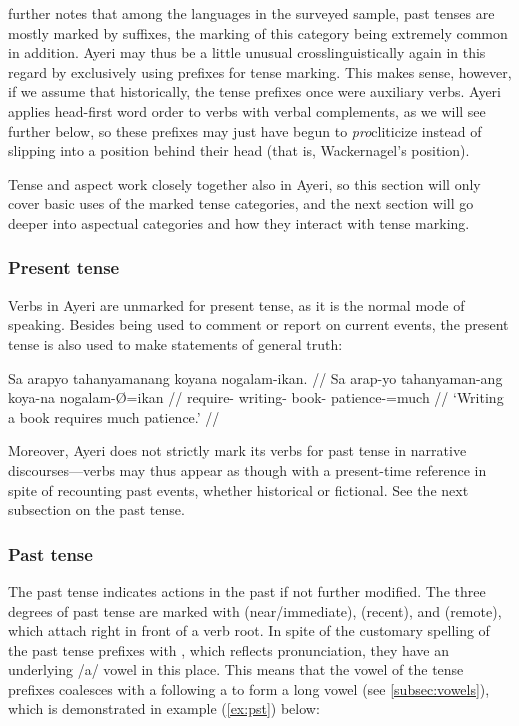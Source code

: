 \citet[117]{dahl1985} further notes that among the languages in the surveyed 
sample, past tenses are mostly marked by suffixes, the marking of this 
category being extremely common in addition. Ayeri may thus be a little unusual 
crosslinguistically again in this regard by exclusively using prefixes for 
tense marking. This makes sense, however, if we assume that historically, the 
tense prefixes once were auxiliary verbs. Ayeri applies head-first word 
order to verbs with verbal complements, as we will see further below, so these 
prefixes may just have begun to \emph{pro}cliticize instead of slipping 
into a position behind their head (that is, Wackernagel's position).

Tense and aspect work closely together also in Ayeri, so this section will only 
cover basic uses of the marked tense categories, and the next section will go 
deeper into aspectual categories and how they interact with tense marking.

\subsubsection{Present tense}
Verbs in Ayeri are unmarked for present tense, as it is the normal mode of 
speaking. Besides being used to comment or report on current events, the 
present tense is also used to make statements of general truth:

\ex\begingl
	\gla Sa arapyo tahanyamanang koyana nogalam-ikan. //
	\glb Sa arap-yo tahanyaman-ang koya-na nogalam-Ø=ikan //
	\glc \PatT{} require-\TsgN{} writing-\Aarg{} book-\Gen{} 
		patience-\Top{}=much //
	\glft `Writing a book requires much patience.' //
\endgl\xe

Moreover, Ayeri does not strictly mark its verbs for past tense in narrative 
discourses---verbs may thus appear as though with a present-time reference in 
spite of recounting past events, whether historical or fictional. See the next 
subsection on the past tense.


\subsubsection{Past tense}
The past tense indicates actions in the past if not further modified. 
The three degrees of past tense are marked with  
(near/immediate),  (recent), and  (remote), which 
attach right in front of a verb root. In spite of the customary spelling of the 
past tense prefixes with , which reflects pronunciation, they have an 
underlying /a/ vowel in this place. This means that the vowel of the tense 
prefixes coalesces with a following a to form a long vowel (see 
\autoref{subsec:vowels}), which is demonstrated in example (\ref{ex:pst}) 
below:


